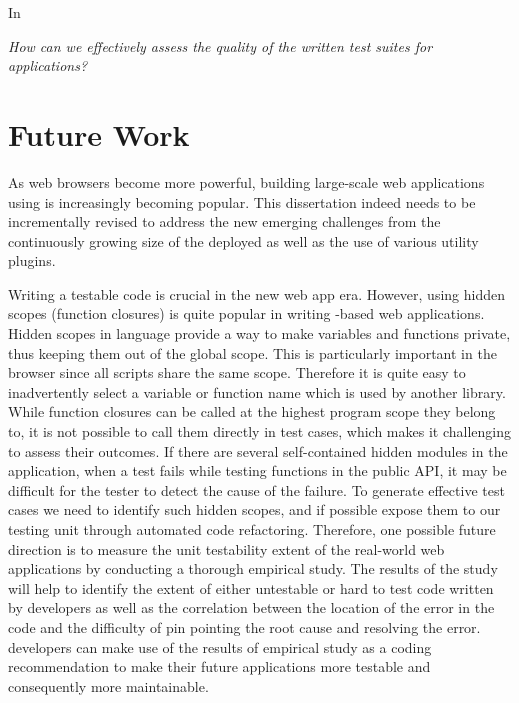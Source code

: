 In    

\emph{How can we effectively assess the quality of the written test suites for \javascript applications?}

\section{Future Work}
As web browsers become more powerful, building large-scale web applications using \javascript is increasingly becoming popular. This dissertation indeed needs to be incrementally revised to address the new emerging challenges from the continuously growing size of the deployed \javascript as well as the use of various \javascript utility plugins. 

Writing a testable code is crucial in the new web app era. However, using hidden scopes (\ie function closures) is quite popular in writing \javascript-based web applications. 
Hidden scopes in \javascript language provide a way to make variables and functions private, thus keeping them out of the global scope.
This is particularly important in the browser since all scripts share the same scope. Therefore it is quite easy to inadvertently select a variable or function name which is used by another library.
While function closures can be called at the highest program scope they belong to, it is not possible
to call them directly in test cases, which makes it challenging to assess their outcomes. 
If there are several self-contained hidden modules in the application, when a test fails while testing functions in the public API, it may be difficult for the tester to detect the cause of the failure.
To generate effective test cases we need to identify such hidden scopes, and if possible expose them to our testing unit through automated code refactoring. Therefore, one possible future direction is to measure the unit testability extent of the real-world \javascript web applications by conducting a thorough empirical study. The results of the study will help to identify the extent of either untestable or hard to test code written by developers as well as the correlation between the location of the error in the code and the difficulty of pin pointing the root cause and resolving the error. \javascript developers can make use of the results of empirical study as a coding recommendation to make their future applications more testable and consequently more maintainable. 

